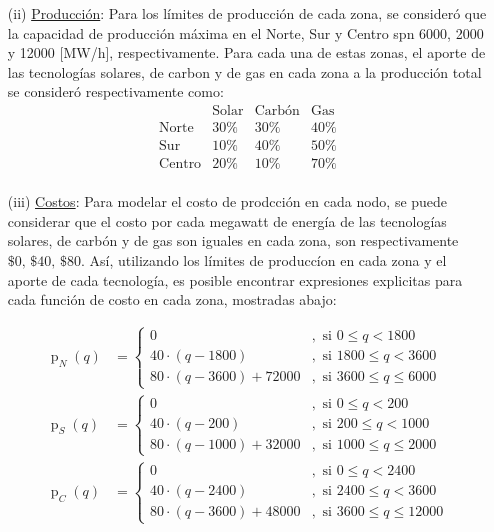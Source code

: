 \documentclass[12pt,twoside]{article}
\begin{document}
\begin{itemize}
		\item [(ii)] \underline{Producci\'on}: Para los l\'imites de producci\'on de cada zona, se consider\'o que la capacidad de producci\'on m\'axima en el Norte, Sur y Centro spn 6000, 2000 y 12000 [MW/h], respectivamente. Para cada una de estas zonas, el aporte de las tecnolog\'ias solares, de carbon y de gas en cada zona a la producci\'on total se consider\'o respectivamente como:
		\begin{equation*}\begin{array}{c|c|c|c}
			& \text{Solar} & \text{Carb\'on} & \text{Gas} \\ \hline
			\text{Norte} & 30\% & 30\% & 40\% \\
			\text{Sur} & 10\% & 40\% & 50\% \\
			\text{Centro} & 20\% & 10\% & 70\% \\
		\end{array}\end{equation*}
		
		\item [(iii)] \underline{Costos}: Para modelar el costo de prodcci\'on en cada nodo, se puede considerar que el costo por cada megawatt de energ\'ia de las tecnolog\'ias solares, de carb\'on y de gas son iguales en cada zona, son respectivamente \(\$0,\,\$40,\,\$80\). As\'i, utilizando los l\'imites de producc\'ion en cada zona y el aporte de cada tecnolog\'ia, es posible encontrar expresiones explicitas para cada funci\'on de costo en cada zona, mostradas abajo: 
		
		\begin{equation*}\begin{aligned}
			\operatorname{p}_N(q)&=\left\{\begin{array}{cl}
					0 & ,\text{ si } 0\leq q<1800 \\
					40\cdot(q-1800) & ,\text{ si } 1800\leq q<3600 \\
					80\cdot(q-3600)+72000 & ,\text{ si } 3600\leq q\leq6000
				\end{array}\right. \\
			\operatorname{p}_S(q)&=\left\{\begin{array}{cl}
					0 & ,\text{ si } 0\leq q<200 \\
					40\cdot(q-200) & ,\text{ si } 200\leq q<1000 \\
					80\cdot(q-1000)+32000 & ,\text{ si } 1000\leq q\leq2000
				\end{array}\right. \\
			\operatorname{p}_C(q)&=\left\{\begin{array}{cl}
					0 & ,\text{ si } 0\leq q<2400 \\
					40\cdot(q-2400) & ,\text{ si } 2400\leq q<3600 \\
					80\cdot(q-3600)+48000 & ,\text{ si } 3600\leq q\leq12000
				\end{array}\right.
		\end{aligned}\end{equation*}
		 

\end{itemize}
\end{document}
